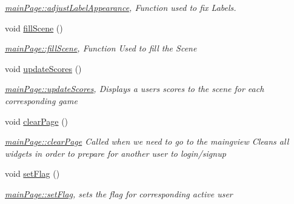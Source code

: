 \begin{DoxyCompactItemize}
\begin{DoxyCompactList}\small\item\em \hyperlink{classmainPage_a5a1a5829cf997a8820ce25f3bc7826bf}{main\+Page\+::adjust\+Label\+Appearance}, Function used to fix Labels. \end{DoxyCompactList}\item 
\mbox{\label{classmainPage_abdede759b961f036fc1414fdfa784304}} 
void \hyperlink{classmainPage_abdede759b961f036fc1414fdfa784304}{fill\+Scene} ()
\begin{DoxyCompactList}\small\item\em \hyperlink{classmainPage_abdede759b961f036fc1414fdfa784304}{main\+Page\+::fill\+Scene}, Function Used to fill the Scene \end{DoxyCompactList}\item 
\mbox{\label{classmainPage_aba3333bfeaa901530d9a832793ef5ca6}} 
void \hyperlink{classmainPage_aba3333bfeaa901530d9a832793ef5ca6}{update\+Scores} ()
\begin{DoxyCompactList}\small\item\em \hyperlink{classmainPage_aba3333bfeaa901530d9a832793ef5ca6}{main\+Page\+::update\+Scores}, Displays a user\textquotesingle{}s scores to the scene for each corresponding game \end{DoxyCompactList}\item 
\mbox{\label{classmainPage_a43bd86b96287348d8ae5ec3368ecd92f}} 
void \hyperlink{classmainPage_a43bd86b96287348d8ae5ec3368ecd92f}{clear\+Page} ()
\begin{DoxyCompactList}\small\item\em \hyperlink{classmainPage_a43bd86b96287348d8ae5ec3368ecd92f}{main\+Page\+::clear\+Page} Called when we need to go to the maingview Cleans all widgets in order to prepare for another user to login/signup \end{DoxyCompactList}\item 
\mbox{\label{classmainPage_a36278cdd4e00b6fc0d5fe6ab20289a71}} 
void \hyperlink{classmainPage_a36278cdd4e00b6fc0d5fe6ab20289a71}{set\+Flag} ()
\begin{DoxyCompactList}\small\item\em \hyperlink{classmainPage_a36278cdd4e00b6fc0d5fe6ab20289a71}{main\+Page\+::set\+Flag}, sets the flag for corresponding active user \end{DoxyCompactList}\end{DoxyCompactItemize}
